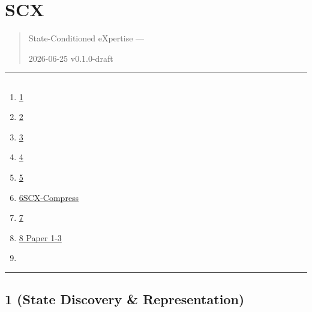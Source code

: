 \documentclass[
  12pt,
]{article}
\author{SCX}
\date{2026}
\providecommand{\tightlist}{%
  \setlength{\itemsep}{0pt}\setlength{\parskip}{0pt}}
\begin{document}
\section{SCX
}\label{scx-ux6846ux67b6ux5b8cux6574ux6a21ux5757ux5206ux6790}

\begin{quote}
State-Conditioned eXpertise ---


2026-06-25 \textbar{} v0.1.0-draft
\end{quote}

\begin{center}\rule{0.5\linewidth}{0.5pt}\end{center}

\subsection{}\label{ux76eeux5f55}

\begin{enumerate}
\def\labelenumi{\arabic{enumi}.}
\tightlist
\item
  \hyperref[ux6a21ux5757-1ux72b6ux6001ux53d1ux73b0ux4e0eux8868ux793a-state-discovery--representation]{
  1}
\item
  \hyperref[ux6a21ux5757-2ux4e13ux5bb6ux53efux9760ux6027ux4f30ux8ba1-expert-reliability-estimation]{
  2}
\item
  \hyperref[ux6a21ux5757-3ux6570ux636eux56dbux5206ux7c7b-data-four-classification]{
  3}
\item
  \hyperref[ux6a21ux5757-4ux72b6ux6001ux6570ux636eux4f30ux503c-state-data-valuation]{
  4}
\item
  \hyperref[ux6a21ux5757-5ux4e13ux5bb6ux8defux7531ux4e0eux4ef2ux88c1-expert-routing--arbitration]{
  5}
\item
  \hyperref[ux6a21ux5757-6scx-compressux5197ux4f59ux538bux7f29]{
  6SCX-Compress}
\item
  \hyperref[ux6a21ux5757-7ux4e3bux52a8ux5b66ux4e60ux7b56ux7565-active-learning-policy]{
  7}
\item
  \hyperref[ux6a21ux5757-8ux4e0e-paper-1-3-ux7684ux8fdeux63a5]{
  8 Paper 1-3 }
\item
  \hyperref[ux5b8cux6574ux7cfbux7edfux67b6ux6784ux56fe]{}
\end{enumerate}

\begin{center}\rule{0.5\linewidth}{0.5pt}\end{center}

\subsection{ 1 (State Discovery \&
Representation)}\label{ux6a21ux5757-1ux72b6ux6001ux53d1ux73b0ux4e0eux8868ux793a-state-discovery-representation}
\end{document}
